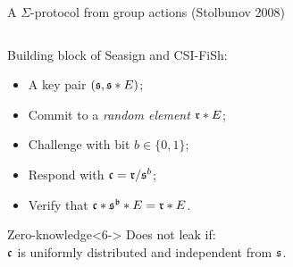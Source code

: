 \documentclass[aspectratio=169]{beamer}
\begin{document}
\begin{frame}{A $\Sigma$-protocol from group actions \small(Stolbunov 2008)}
  \begin{columns}
    \begin{column}{0.55\textwidth}
      Building block of Seasign and CSI-FiSh:

      \medskip
      \begin{itemize}
      \item<1-> A key pair \emph{$(\frak{s}, \frak{s}*E)$};
      \item<2-> Commit to a \emph{random element $\frak{r}*E$};
      \item<3-> Challenge with bit \emph{$b\in\{0,1\}$};
      \item<4-> Respond with \emph{$\frak{c} = \frak{r}/\frak{s}^b$};
      \item<5-> Verify that \emph{$\frak{c}*\frak{s^b}*E = \frak{r}*E$}.
      \end{itemize}

      \begin{block}{Zero-knowledge}<6->
        \centering
        Does not leak if:\\
        \alert{$\frak{c}$ is uniformly distributed} and independent from $\frak{s}$.
      \end{block}

    \end{column}  
    \begin{column}{0.40\textwidth}
      \centering
    \end{column}  
  \end{columns}
\end{frame}

\end{document}
